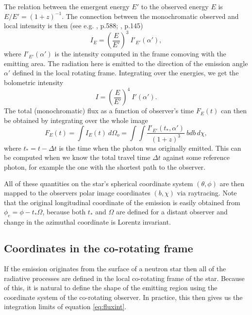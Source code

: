 \documentclass[iop, usenatbib]{emulateapj}
\newcommand{\be}{\begin{equation}}
\newcommand{\ee}{\end{equation}}
\begin{document}
The relation between the emergent energy $E'$ to the observed energy $E$ is $E/E' = (1 + z)^{-1}$.
The connection between the monochromatic observed and local intensity is then (see e.g. \citealt{MTW73}, p.588; \citealt{RL79}, p.145)
\be
I_E = \left( \frac{E}{E'} \right)^3 ~I'_{E'}(\alpha'),
\ee
where $I'_{E'}(\alpha')$ is the intensity computed in the frame comoving with the emitting area.
The radiation here is emitted to the direction of the emission angle $\alpha'$ defined in the local rotating frame.
Integrating over the energies, we get the bolometric intensity
\be
I = \left(\frac{E}{E'} \right)^4 ~I'(\alpha').
\ee
The total (monochromatic) flux as a function of observer's time $F_E(t)$ can then be obtained by integrating over the whole image
\be\label{eq:fluxint}
F_E(t) = \int I_{E}(t) ~d\Omega_o = \int\int \frac{I'_{E'}(t_*, \alpha')}{(1+z)^3}  ~bdb \, d\chi,
\ee
where $t_* = t - \Delta t$ is the time when the photon was originally emitted. 
This can be computed when we know the total travel time $\Delta t$ against some reference photon, for example the one with the shortest path to the observer.

All of these quantities on the star's spherical coordinate system $(\theta, \phi)$ are then mapped to the observers polar image coordinates $(b, \chi)$ via raytracing.
Note that the original longitudinal coordinate of the emission is easily obtained from $\phi_e = \phi - t_* \Omega$, because both $t_*$ and $\Omega$ are defined for a distant observer and change in the azimuthal coordinate is Lorentz invariant.


\subsection{Coordinates in the co-rotating frame}
If the emission originates from the surface of a neutron star then all of the radiative processes are defined in the local co-rotating frame of the star.
Because of this, it is natural to define the shape of the emitting region using the coordinate system of the co-rotating observer.  
In practice, this then gives us the integration limits of equation \eqref{eq:fluxint}.
\end{document}
